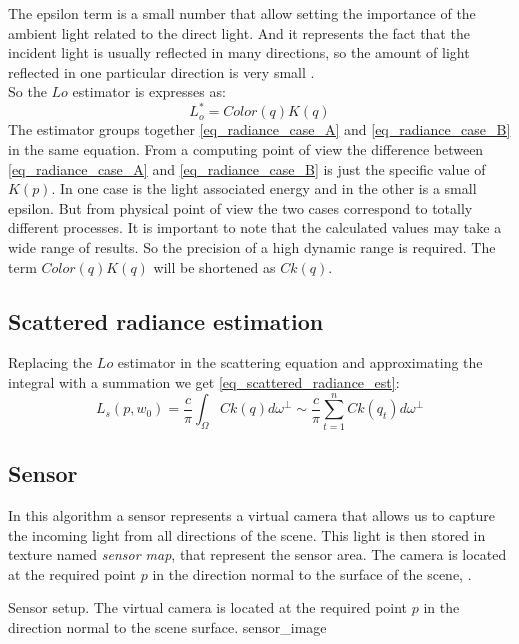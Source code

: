 \documentclass[10pt, conference]{IEEEtran}
\begin{document}
The epsilon term is a small number that allow setting the importance of the ambient light related to the direct light. And it represents the fact that the incident light is usually reflected in many directions, so the amount of light reflected in one particular direction is very small \cite{brdf}.\\
So the $Lo$ estimator is expresses as:
\[
	L^*_o = Color(q)K(q)
\]
The estimator groups together \ref{eq_radiance_case_A} and \ref{eq_radiance_case_B} in the same equation. From a computing point of view the difference between \ref{eq_radiance_case_A} and \ref{eq_radiance_case_B} is just the specific value of $K(p)$. In one case is the light associated energy and in the other is a small epsilon. But from physical point of view the two cases correspond to totally different processes. It is important to note that the calculated values may take a wide range of results. So the precision of a high dynamic range \cite{high_dynamic_range} is required. The term $Color(q)K(q)$ will be shortened as $Ck(q)$.



\subsection{Scattered radiance estimation}

Replacing the $Lo$ estimator in the scattering equation and approximating the integral with a summation we get \ref{eq_scattered_radiance_est}:
\begin{equation}
	\label{eq_scattered_radiance_est}
	L_s(p, w_0)=\frac{c}{\pi}\int_\Omega Ck(q)d\omega^\perp \sim \frac{c}{\pi}\sum_{t=1}^n{Ck(q_t)}d\omega^\perp
\end{equation}		

\subsection{Sensor}

In this algorithm a sensor represents a virtual camera that allows us to capture the incoming light from all directions of the scene. 
This light is then stored in texture named \emph{sensor map}, that represent the sensor area. 
The camera is located at the required point $p$ in the direction normal to the surface of the scene, .

\subimages
	{Sensor setup. The virtual camera is located at the required point $p$ in the direction normal to the scene surface.}
	{sensor_image}{
}
\end{document}
